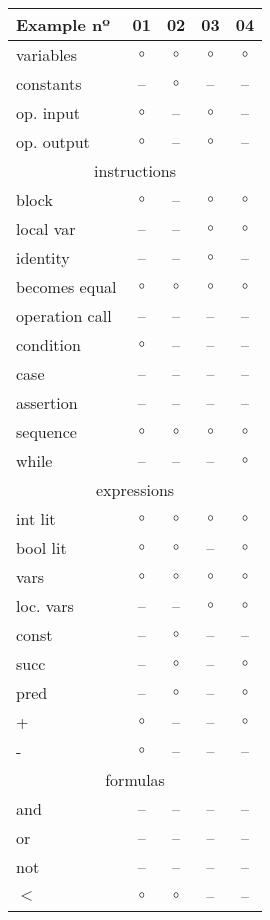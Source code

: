 \documentclass{llncs}
\begin{document}
\begin{center}
\newcommand{\no}[0]{--}
\newcommand{\yes}[0]{$\circ$}
\begin{tabular}{|l|c|c|c|c|}
\hline
Example nº & 01 & 02 & 03 & 04\\
\hline
variables & \yes & \yes & \yes & \yes \\
constants & \no & \yes & \no & \no \\
op. input & \yes & \no & \yes & \no \\
op. output & \yes & \no & \yes & \no \\
\hline
\multicolumn{5}{|c|}{instructions} \\
\hline
block & \yes & \no & \yes & \yes\\
local var & \no & \no & \yes & \yes \\
identity & \no & \no & \yes & \no \\
becomes equal & \yes & \yes & \yes & \yes \\
operation call & \no & \no & \no & \no \\
condition & \yes & \no & \no & \no \\
case & \no & \no & \no & \no \\
assertion & \no & \no & \no & \no\\
sequence & \yes & \yes & \yes & \yes \\
while & \no & \no & \no & \yes \\
\hline
\multicolumn{5}{|c|}{expressions} \\
\hline
int lit & \yes & \yes & \yes & \yes \\
bool lit & \yes & \yes & \no & \yes \\
vars & \yes & \yes & \yes & \yes \\
loc. vars & \no & \no & \yes & \yes \\
const & \no & \yes & \no & \no \\ 
succ & \no & \yes & \no & \yes \\
pred & \no & \yes & \no & \yes \\
+ & \yes & \no & \no & \yes \\
- & \yes & \no & \no & \no\\
\hline
\multicolumn{5}{|c|}{formulas} \\
\hline
and & \no & \no & \no & \no \\
or & \no & \no & \no & \no \\
not & \no & \no & \no & \no \\
$<$ & \yes & \yes & \no & \no\\
\hline
\end{tabular}
\end{center}
\end{document}

